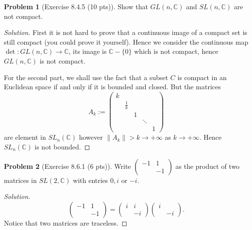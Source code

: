 \documentclass{article}
\theoremstyle{definition}
\newtheorem{problem}{Problem}
\theoremstyle{plain}
\begin{document}
\begin{problem}[Exercise 8.4.5 (10 pts)]
Show that $GL(n,\mathbb{C})$ and $SL(n,\mathbb{C})$ are not compact.
\end{problem}
\begin{adjustwidth}{0.7cm}{}
\color{blue}
\begin{proof}[Solution]
First it is not hard to prove that a continuous image of a compact set is still compact (you could prove it yourself). Hence we consider the continuous map $\det:GL(n,\mathbb{C})\to\mathbb{C}$, its image is $\mathbb{C}-\{0\}$ which is not compact, hence $GL(n,\mathbb{C})$ is not compact.\par
For the second part, we shall use the fact that a subset $C$ is compact in an Euclidean space if and only if it is bounded and closed. But the matrices
\begin{displaymath}
A_k:=\begin{pmatrix}k&&&&\\ &\frac{1}{k}&&&\\ &&1&&\\ &&&\ddots&\\ &&&&1
\end{pmatrix}
\end{displaymath}
are element in $SL_n(\mathbb{C})$ however $\lVert A_k\rVert>k\to+\infty$ as $k\to+\infty$. Hence $SL_n(\mathbb{C})$ is not bounded.
\color{black}
\end{proof}
\end{adjustwidth}

\begin{problem}[Exercise 8.6.1 (6 pts)]
Write $\begin{pmatrix}-1&1\\ &-1\end{pmatrix}$ as the product of two matrices in $SL(2,\mathbb{C})$ with entries $0,i$ or $-i$.
\end{problem}
\begin{adjustwidth}{0.7cm}{}
\color{blue}
\begin{proof}[Solution]
\begin{displaymath}
\begin{pmatrix}-1&1\\ &-1\end{pmatrix}=\begin{pmatrix}i&i\\ &-i\end{pmatrix}\begin{pmatrix}i&\\ &-i\end{pmatrix}.
\end{displaymath}
Notice that two matrices are traceless.
\color{black}
\end{proof}
\end{adjustwidth}
\end{document}
